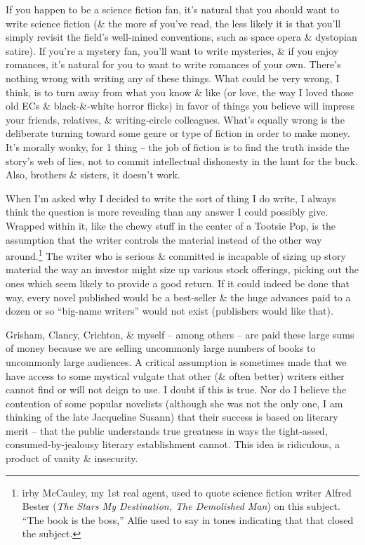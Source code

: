 \documentclass{article}
\numberwithin{equation}{section}
\begin{document}
If you happen to be a science fiction fan, it's natural that you should want to write science fiction (\& the more sf you've read, the less likely it is that you'll simply revisit the field's well-mined conventions, such as space opera \& dystopian satire). If you're a mystery fan, you'll want to write mysteries, \& if you enjoy romances, it's natural for you to want to write romances of your own. There's nothing wrong with writing any of these things. What could be very wrong, I think, is to turn away from what you know \& like (or love, the way I loved those old ECs \& black-\&-white horror flicks) in favor of things you believe will impress your friends, relatives, \& writing-circle colleagues. What's equally wrong is the deliberate turning toward some genre or type of fiction in order to make money. It's morally wonky, for 1 thing -- the job of fiction is to find the truth inside the story's web of lies, not to commit intellectual dishonesty in the hunt for the buck. Also, brothers \& sisters, it doesn't work.

When I'm asked why I decided to write the sort of thing I do write, I always think the question is more revealing than any answer I could possibly give. Wrapped within it, like the chewy stuff in the center of a Tootsie Pop, is the assumption that the writer controls the material instead of the other way around.\footnote{irby McCauley, my 1st real agent, used to quote science fiction writer Alfred Bester (\textit{The Stars My Destination, The Demolished Man}) on this subject. ``The book is the boss,'' Alfie used to say in tones indicating that that closed the subject.} The writer who is serious \& committed is incapable of sizing up story material the way an investor might size up various stock offerings, picking out the ones which seem likely to provide a good return. If it could indeed be done that way, every novel published would be a best-seller \& the huge advances paid to a dozen or so ``big-name writers'' would not exist (publishers would like that).

Grisham, Clancy, Crichton, \& myself -- among others -- are paid these large sums of money because we are selling uncommonly large numbers of books to uncommonly large audiences. A critical assumption is sometimes made that we have access to some mystical vulgate that other (\& often better) writers either cannot find or will not deign to use. I doubt if this is true. Nor do I believe the contention of some popular novelists (although she was not the only one, I am thinking of the late Jacqueline Susann) that their success is based on literary merit -- that the public understands true greatness in ways the tight-assed, consumed-by-jealousy literary establishment cannot. This idea is ridiculous, a product of vanity \& insecurity.
\end{document}
